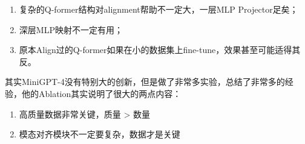 \documentclass[zihao=false,fontset=windows]{ctexart}
\begin{document}
\begin{enumerate}
\item 复杂的Q-former结构对alignment帮助不一定大，一层MLP Projector足矣；\par
\item 深层MLP映射不一定有用；\par
\item 原本Align过的Q-former如果在小的数据集上fine-tune，效果甚至可能适得其反。\par
\end{enumerate}

\par\vspace{1.15em}\par\vspace{0.28em}

其实MiniGPT-4没有特别大的创新，但是做了非常多实验，总结了非常多的经验，他的Ablation其实说明了很大的两点内容：\par

\begin{enumerate}
\item \textcolor{feishuRed}{高质量数据非常关键，质量 > 数量}\par
\item \textcolor{feishuRed}{模态对齐模块不一定要复杂，数据才是关键}\par
\end{enumerate}
\end{document}
